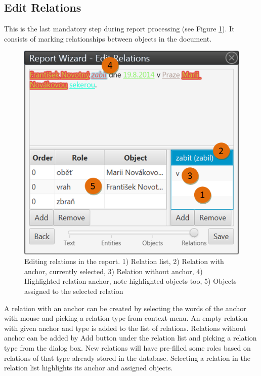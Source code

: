 \subsection{Edit Relations}
\label{sssec:EditRelations}

This is the last mandatory step during report processing (see Figure
\ref{fig:Relations}). It consists of marking relationships between objects in
the document.

\begin{figure}[!htb]
        \centering
        \includegraphics[width=\textwidth]{Images/relations}
        \caption{Editing relations in the report. 1) Relation list, 2) Relation
		 with anchor, currently selected, 3) Relation without anchor, 4) Highlighted
		 relation anchor, note highlighted objects too, 5) Objects assigned to
		 the selected relation}
        \label{fig:Relations}
\end{figure}

A relation with an anchor can be created by selecting the words of the anchor
with
mouse and picking a relation type from context menu. An empty relation with given
anchor and type is added to the list of relations. Relations without anchor
can be added by Add button under the relation list and picking a relation type
from the dialog box. New relations will have pre-filled some roles based on relations of
that type already stored in the database. Selecting a relation in the relation
list highlights its anchor and assigned objects.

